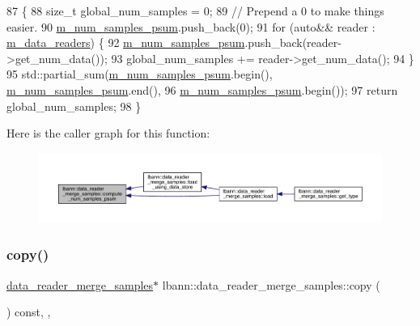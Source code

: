 \begin{DoxyCode}
87                                                            \{
88   \textcolor{keywordtype}{size\_t} global\_num\_samples = 0;
89   \textcolor{comment}{// Prepend a 0 to make things easier.}
90   \hyperlink{classlbann_1_1data__reader__merge__samples_afd297d61c11bb6b0d03ce64836bd1300}{m\_num\_samples\_psum}.push\_back(0);
91   \textcolor{keywordflow}{for} (\textcolor{keyword}{auto}&& reader : \hyperlink{classlbann_1_1generic__compound__data__reader_a9815e94ade5873415fd766e09d956d5b}{m\_data\_readers}) \{
92     \hyperlink{classlbann_1_1data__reader__merge__samples_afd297d61c11bb6b0d03ce64836bd1300}{m\_num\_samples\_psum}.push\_back(reader->get\_num\_data());
93     global\_num\_samples += reader->get\_num\_data();
94   \}
95   std::partial\_sum(\hyperlink{classlbann_1_1data__reader__merge__samples_afd297d61c11bb6b0d03ce64836bd1300}{m\_num\_samples\_psum}.begin(), 
      \hyperlink{classlbann_1_1data__reader__merge__samples_afd297d61c11bb6b0d03ce64836bd1300}{m\_num\_samples\_psum}.end(),
96                    \hyperlink{classlbann_1_1data__reader__merge__samples_afd297d61c11bb6b0d03ce64836bd1300}{m\_num\_samples\_psum}.begin());
97   \textcolor{keywordflow}{return} global\_num\_samples;
98 \}
\end{DoxyCode}
Here is the caller graph for this function\+:\nopagebreak
\begin{figure}[H]
\begin{center}
\leavevmode
\includegraphics[width=350pt]{classlbann_1_1data__reader__merge__samples_aafa54258bdc9d888da61c817462cdf65_icgraph}
\end{center}
\end{figure}
\mbox{\label{classlbann_1_1data__reader__merge__samples_ae22e720cfc9c6a196a04b7b65472618e}} 
\subsubsection{\texorpdfstring{copy()}{copy()}}
{\footnotesize\ttfamily \hyperlink{classlbann_1_1data__reader__merge__samples}{data\+\_\+reader\+\_\+merge\+\_\+samples}$\ast$ lbann\+::data\+\_\+reader\+\_\+merge\+\_\+samples\+::copy (\begin{DoxyParamCaption}{ }\end{DoxyParamCaption}) const\hspace{0.3cm}{\ttfamily [inline]}, {\ttfamily [override]}, {\ttfamily [virtual]}}



